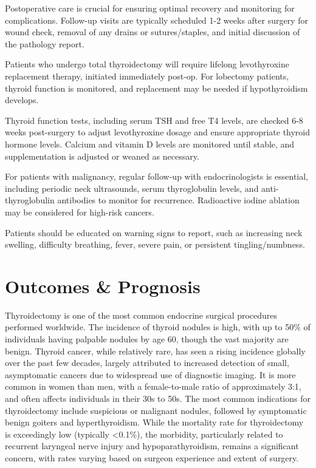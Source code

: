 Postoperative care is crucial for ensuring optimal recovery and monitoring for complications. Follow-up visits are typically scheduled 1-2 weeks after surgery for wound check, removal of any drains or sutures/staples, and initial discussion of the pathology report. 

Patients who undergo total thyroidectomy will require lifelong levothyroxine replacement therapy, initiated immediately post-op. For lobectomy patients, thyroid function is monitored, and replacement may be needed if hypothyroidism develops. 

Thyroid function tests, including serum TSH and free T4 levels, are checked 6-8 weeks post-surgery to adjust levothyroxine dosage and ensure appropriate thyroid hormone levels. Calcium and vitamin D levels are monitored until stable, and supplementation is adjusted or weaned as necessary.

For patients with malignancy, regular follow-up with endocrinologists is essential, including periodic neck ultrasounds, serum thyroglobulin levels, and anti-thyroglobulin antibodies to monitor for recurrence. Radioactive iodine ablation may be considered for high-risk cancers. 

Patients should be educated on warning signs to report, such as increasing neck swelling, difficulty breathing, fever, severe pain, or persistent tingling/numbness.

\section*{Outcomes \& Prognosis}
Thyroidectomy is one of the most common endocrine surgical procedures performed worldwide. The incidence of thyroid nodules is high, with up to 50\% of individuals having palpable nodules by age 60, though the vast majority are benign. Thyroid cancer, while relatively rare, has seen a rising incidence globally over the past few decades, largely attributed to increased detection of small, asymptomatic cancers due to widespread use of diagnostic imaging. It is more common in women than men, with a female-to-male ratio of approximately 3:1, and often affects individuals in their 30s to 50s. The most common indications for thyroidectomy include suspicious or malignant nodules, followed by symptomatic benign goiters and hyperthyroidism. While the mortality rate for thyroidectomy is exceedingly low (typically <0.1\%), the morbidity, particularly related to recurrent laryngeal nerve injury and hypoparathyroidism, remains a significant concern, with rates varying based on surgeon experience and extent of surgery.

